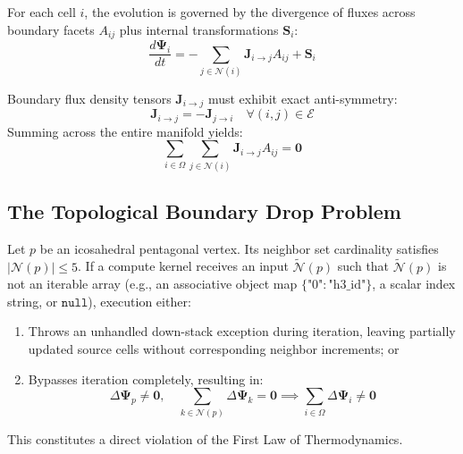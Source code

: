 \documentclass[10pt,journal,compsoc]{IEEEtran}
\begin{document}
For each cell $i$, the evolution is governed by the divergence of fluxes across boundary facets $A_{ij}$ plus internal transformations $\mathbf{S}_i$:
\begin{equation}
\frac{d\mathbf{\Psi}_i}{dt} = -\sum_{j \in \mathcal{N}(i)} \mathbf{J}_{i \to j} A_{ij} + \mathbf{S}_i
\end{equation}

Boundary flux density tensors $\mathbf{J}_{i \to j}$ must exhibit exact anti-symmetry:
\begin{equation}
\mathbf{J}_{i \to j} = -\mathbf{J}_{j \to i} \quad \forall (i, j) \in \mathcal{E}
\end{equation}
Summing across the entire manifold yields:
\begin{equation}
\sum_{i \in \Omega} \sum_{j \in \mathcal{N}(i)} \mathbf{J}_{i \to j} A_{ij} = \mathbf{0}
\end{equation}

\subsection{The Topological Boundary Drop Problem}
Let $p$ be an icosahedral pentagonal vertex. Its neighbor set cardinality satisfies $|\mathcal{N}(p)| \le 5$. If a compute kernel receives an input $\widetilde{\mathcal{N}}(p)$ such that $\widetilde{\mathcal{N}}(p)$ is not an iterable array (e.g., an associative object map $\{\text{"0"}: \text{"h3\_id"}\}$, a scalar index string, or $\texttt{null}$), execution either:
\begin{enumerate}
    \item Throws an unhandled down-stack exception during iteration, leaving partially updated source cells without corresponding neighbor increments; or
    \item Bypasses iteration completely, resulting in:
    \begin{equation}
    \Delta \mathbf{\Psi}_p \ne \mathbf{0}, \quad \sum_{k \in \mathcal{N}(p)} \Delta \mathbf{\Psi}_k = \mathbf{0} \implies \sum_{i \in \Omega} \Delta \mathbf{\Psi}_i \ne \mathbf{0}
    \end{equation}
\end{enumerate}
This constitutes a direct violation of the First Law of Thermodynamics.
\end{document}
